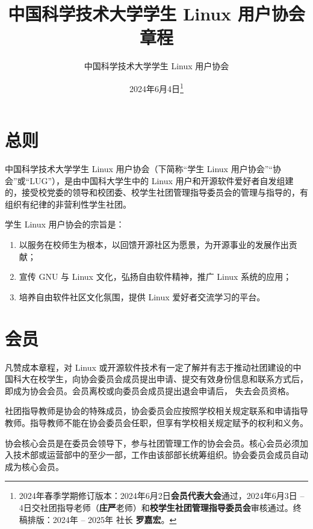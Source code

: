 

\title{\bfseries 中国科学技术大学学生 Linux 用户协会章程}
\author{中国科学技术大学学生 Linux 用户协会}
\date{2024年6月4日\thanks{2024年春季学期修订版本：2024年6月2日\textbf{会员代表大会}通过，2024年6月3日 -- 4日交社团指导老师（\textbf{庄严}老师）和\textbf{校学生社团管理指导委员会}审核通过。终稿排版：2024年 -- 2025年 社长 \textbf{罗嘉宏}。}}


	\maketitle
	
	\tableofcontents
	
	\pagestyle{otherpage}
	\thispagestyle{firstpage}
	
	\section{总则}
	\term 中国科学技术大学学生 Linux 用户协会（下简称“学生 Linux 用户协会”“协会”或“LUG”），是由中国科大学生中的 Linux 用户和开源软件爱好者自发组建的，接受校党委的领导和校团委、校学生社团管理指导委员会的管理与指导的，有组织有纪律的非营利性学生社团。
	
	\term 学生 Linux 用户协会的宗旨是：
	\begin{enumerate}
		\item 以服务在校师生为根本，以回馈开源社区为愿景，为开源事业的发展作出贡献；
		\item 宣传 GNU 与 Linux 文化，弘扬自由软件精神，推广 Linux 系统的应用；
		\item 培养自由软件社区文化氛围，提供 Linux 爱好者交流学习的平台。
	\end{enumerate}
	
	\section{会员}
	
	\term 凡赞成本章程，对 Linux 或开源软件技术有一定了解并有志于推动社团建设的中国科大在校学生，向协会委员会成员提出申请、提交有效身份信息和联系方式后，即成为协会会员。会员离校或向委员会成员提出退会申请后， 失去会员资格。
	
	社团指导教师是协会的特殊成员，协会委员会应按照学校相关规定联系和申请指导教师。指导教师不能在协会委员会任职，但享有学校相关规定赋予的权利和义务。
	
	\term 协会核心会员是在委员会领导下，参与社团管理工作的协会会员。核心会员必须加入技术部或运营部中的至少一部，工作由该部部长统筹组织。协会委员会成员自动成为核心会员。
	
